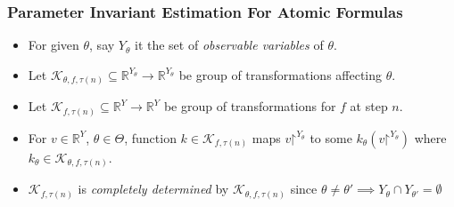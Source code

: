 \documentclass{beamer}
\renewcommand{\restriction}{\mathord{\upharpoonright}}
\newcommand{\typeReal}{\mathbb{R}}
\newcommand{\K}{\mathcal{K}}
\begin{document}
\begin{frame}
\frametitle{Parameter Invariant Estimation For Atomic Formulas}
    \begin{itemize}
        \item For given $\theta$, say $Y_{\theta}$ it the
            set of \textit{observable variables} of $\theta$.
        \item Let $\K_{\theta, f, \tau(n)} \subseteq \typeReal^{Y_{\theta}} \to \typeReal^{Y_{\theta}}$ be
            group of transformations affecting $\theta$.
        \item Let $\K_{f, \tau(n)} \subseteq \typeReal^{Y}\to \typeReal^{Y}$
           be group of transformations for $f$ at step $n$.
        \item For $v \in \typeReal^{Y}$, $\theta \in \Theta$, function
            $k \in  \K_{f, \tau(n)}$ maps $v \restriction^{Y_{\theta}}$ to some
            $k_{\theta}(v \restriction^{Y_{\theta}})$
           where $k_{\theta} \in \K_{\theta, f, \tau(n)}$.
       \item $\K_{f, \tau(n)}$ is \textit{completely determined}
           by $\K_{\theta, f, \tau(n)}$ since
            $\theta \neq \theta' \implies Y_{\theta}\cap Y_{\theta'}=\emptyset$


    \end{itemize}
\end{frame}
\end{document}
